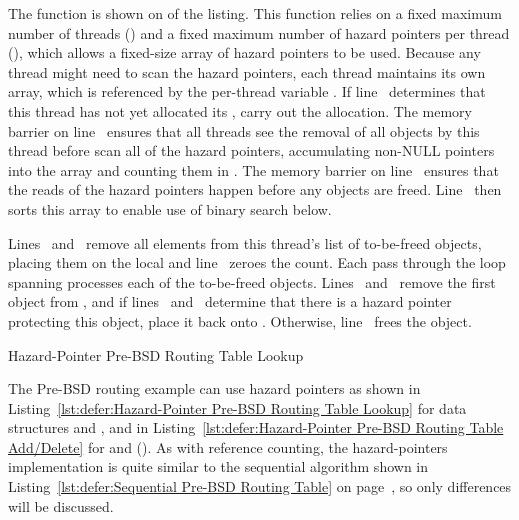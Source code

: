 \begin{fcvref}
The  function is shown on 
of the listing.
This function relies on a fixed maximum number of threads ()
and a fixed maximum number of hazard pointers per thread (),
which allows a fixed-size array of hazard pointers to be used.
Because any thread might need to scan the hazard pointers, each thread
maintains its own array, which is referenced by the per-thread variable
.
If line~ determines that this thread has not yet allocated its
,  carry out the allocation.
The memory barrier on line~ ensures that all threads see the
removal of all objects by this thread before
 scan
all of the hazard pointers, accumulating non-NULL pointers into
the  array and counting them in .
The memory barrier on line~ ensures that the reads of
the hazard pointers
happen before any objects are freed.
Line~ then sorts this array to enable use of binary search below.

Lines~ and~
remove all elements from this thread's list of
to-be-freed objects, placing them on the local 
and line~ zeroes the count.
Each pass through the loop spanning
 processes each
of the to-be-freed objects.
Lines~ and~
remove the first object from ,
and if lines~ and~
determine that there is a hazard pointer
protecting this object, 
place it back onto .
Otherwise, line~ frees the object.
\end{fcvref}

\begin{listing}[tbp]

\caption{Hazard-Pointer Pre-BSD Routing Table Lookup}
\label{lst:defer:Hazard-Pointer Pre-BSD Routing Table Lookup}
\end{listing}

The Pre-BSD routing example can use hazard pointers as shown in
Listing~\ref{lst:defer:Hazard-Pointer Pre-BSD Routing Table Lookup}
for data structures and , and in
Listing~\ref{lst:defer:Hazard-Pointer Pre-BSD Routing Table Add/Delete}
for  and 
().
As with reference counting, the hazard-pointers implementation
is quite similar to the sequential algorithm shown in
Listing~\ref{lst:defer:Sequential Pre-BSD Routing Table}
on
page~\pageref{lst:defer:Sequential Pre-BSD Routing Table},
so only differences will be discussed.

